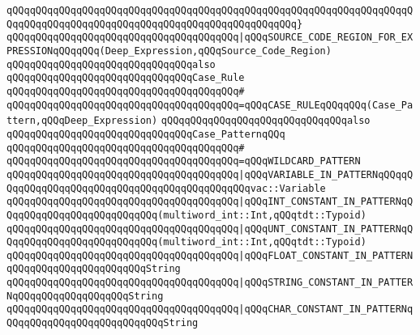 \verb|qQQqqQQqqQQqqQQqqQQqqQQqqQQqqQQqqQQqqQQqqQQqqQQqqQQqqQQqqQQqqQQqqQQqqQQqqQQqqQQqqQQqqQQqqQQqqQQqqQQqqQQqqQQqqQQqqQQqqQQq}|\newline
\newline
\verb|qQQqqQQqqQQqqQQqqQQqqQQqqQQqqQQqqQQqqQQq|\verb#|qQQqSOURCE_CODE_REGION_FOR_EXPRESSIONqQQqqQQq(Deep_Expression,qQQqSource_Code_Region)#\newline
\newline
\newline
\newline
\verb|qQQqqQQqqQQqqQQqqQQqqQQqqQQqqQQqalso|\newline
\verb|qQQqqQQqqQQqqQQqqQQqqQQqqQQqqQQqCase_Rule|\newline
\verb|qQQqqQQqqQQqqQQqqQQqqQQqqQQqqQQqqQQqqQQq#|\newline
\verb|qQQqqQQqqQQqqQQqqQQqqQQqqQQqqQQqqQQqqQQq=qQQqCASE_RULEqQQqqQQq(Case_Pattern,qQQqDeep_Expression)|\newline
\newline
\newline
\newline
\verb|qQQqqQQqqQQqqQQqqQQqqQQqqQQqqQQqalso|\newline
\verb|qQQqqQQqqQQqqQQqqQQqqQQqqQQqqQQqCase_PatternqQQq|\newline
\verb|qQQqqQQqqQQqqQQqqQQqqQQqqQQqqQQqqQQqqQQq#|\newline
\verb|qQQqqQQqqQQqqQQqqQQqqQQqqQQqqQQqqQQqqQQq=qQQqWILDCARD_PATTERN|\newline
\verb|qQQqqQQqqQQqqQQqqQQqqQQqqQQqqQQqqQQqqQQq|\verb#|qQQqVARIABLE_IN_PATTERNqQQqqQQqqQQqqQQqqQQqqQQqqQQqqQQqqQQqqQQqqQQqqQQqvac::Variable#\newline
\verb|qQQqqQQqqQQqqQQqqQQqqQQqqQQqqQQqqQQqqQQq|\verb#|qQQqINT_CONSTANT_IN_PATTERNqQQqqQQqqQQqqQQqqQQqqQQqqQQq(multiword_int::Int,qQQqtdt::Typoid)#\newline
\verb|qQQqqQQqqQQqqQQqqQQqqQQqqQQqqQQqqQQqqQQq|\verb#|qQQqUNT_CONSTANT_IN_PATTERNqQQqqQQqqQQqqQQqqQQqqQQqqQQq(multiword_int::Int,qQQqtdt::Typoid)#\newline
\verb|qQQqqQQqqQQqqQQqqQQqqQQqqQQqqQQqqQQqqQQq|\verb#|qQQqFLOAT_CONSTANT_IN_PATTERNqQQqqQQqqQQqqQQqqQQqqQQqString#\newline
\verb|qQQqqQQqqQQqqQQqqQQqqQQqqQQqqQQqqQQqqQQq|\verb#|qQQqSTRING_CONSTANT_IN_PATTERNqQQqqQQqqQQqqQQqqQQqString#\newline
\verb|qQQqqQQqqQQqqQQqqQQqqQQqqQQqqQQqqQQqqQQq|\verb#|qQQqCHAR_CONSTANT_IN_PATTERNqQQqqQQqqQQqqQQqqQQqqQQqqQQqString#\newline
